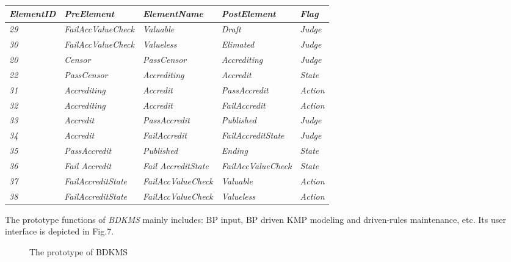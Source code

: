 \documentclass{elsarticle}
\begin{document}
\begin{table}[!b]
\tablehead{}
\begin{supertabular}{m{0.6in}m{1.1052598in}m{1.1in}m{1in}m{0.4in}}
\hline
\bfseries\itshape ElementID &
\bfseries\itshape PreElement &
\bfseries\itshape ElementName &
\bfseries\itshape PostElement &
\bfseries\itshape Flag\\\hline
\itshape 29 &
\itshape FailAccValueCheck &
\itshape Valuable &
\itshape Draft &
\itshape Judge\\
\itshape 30 &
\itshape FailAccValueCheck &
\itshape Valueless &
\itshape Elimated &
\itshape Judge\\
\itshape 20 &
\itshape Censor &
\itshape PassCensor &
\itshape Accrediting &
\itshape Judge\\
\itshape 22 &
\itshape PassCensor &
\itshape Accrediting &
\itshape Accredit &
\itshape State\\
\itshape 31 &
\itshape Accrediting &
\itshape Accredit &
\itshape PassAccredit &
\itshape Action\\
\itshape 32 &
\itshape Accrediting &
\itshape Accredit &
\itshape FailAccredit &
\itshape Action\\
\itshape 33 &
\itshape Accredit &
\itshape PassAccredit &
\itshape Published &
\itshape Judge\\
\itshape 34 &
\itshape Accredit &
\itshape FailAccredit &
\itshape FailAccreditState &
\itshape Judge\\
\itshape 35 &
\itshape PassAccredit &
\itshape Published &
\itshape Ending &
\itshape State\\
\itshape 36 &
\itshape Fail Accredit &
\itshape Fail AccreditState &
\itshape FailAccValueCheck &
\itshape State\\
\itshape 37 &
\itshape FailAccreditState &
\itshape FailAccValueCheck &
\itshape Valuable &
\itshape Action\\
\itshape 38 &
\itshape FailAccreditState &
\itshape FailAccValueCheck &
\itshape Valueless &
\itshape Action\\\hline
\end{supertabular}
\end{table}

\textrm{The prototype functions of }\textrm{\textit{BDKMS}}\textrm{
mainly includes: BP input, BP driven KMP modeling and driven-rules
maintenance, etc. Its user interface is depicted in Fig.7.}

  \begin{figure}[ht]
    \centering
    \scalebox{0.62}{\texttt{[image: 07]}}
    \caption{  The prototype of BDKMS}
  \end{figure}
\end{document}
